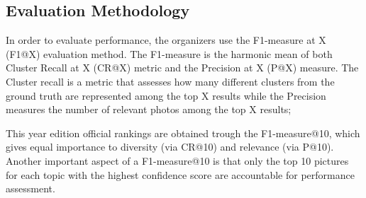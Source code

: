         \subsection{Evaluation Methodology}
        \label{sec:eval}

        In order to evaluate performance, the organizers use the F1-measure at X (F1@X) evaluation method. The F1-measure is the harmonic mean of both Cluster Recall at X (CR@X) metric and the Precision at X (P@X) measure. The Cluster recall is a metric that assesses how many different clusters from the ground truth are represented among the top X results  while the Precision measures the number of  relevant photos among the top X results;

        This year edition official rankings are obtained trough the F1-measure@10, which gives equal importance to diversity (via CR@10) and relevance (via P@10). Another important aspect of a F1-measure@10 is that only the top 10 pictures for each topic with the highest confidence score are accountable for performance assessment.

    
    \newpage
 